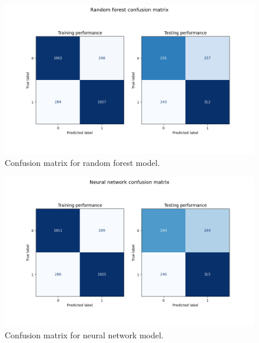 \documentclass[12pt]{article}
\begin{document}
\newpage 

\begin{figure}[h!]
\centering
\begin{center} \includegraphics[width=6in]{"../output/rf_confusion_matrix.png"} \end{center}
\caption{Confusion matrix for random forest model.}
\label{fig:rf-cm}
\end{figure}

\newpage 

\begin{figure}[h!]
\centering
\begin{center} \includegraphics[width=6in]{"../output/nn_confusion_matrix.png"} \end{center}
\caption{Confusion matrix for neural network model.}
\label{fig:nn-cm}
\end{figure}
\end{document}
